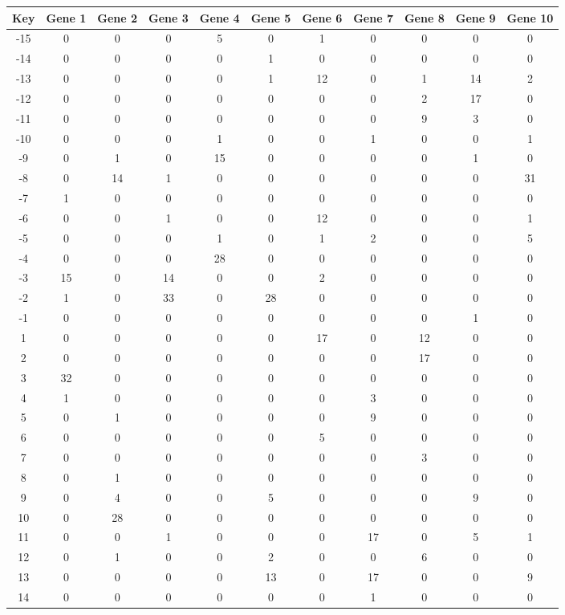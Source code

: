 \begin{tabular}{|c|c|c|c|c|c|c|c|c|c|c|}
\hline
Key & Gene 1 & Gene 2 & Gene 3 & Gene 4 & Gene 5 & Gene 6 & Gene 7 & Gene 8 & Gene 9 & Gene 10 \\
\hline
-15 & 0 & 0 & 0 & 5 & 0 & 1 & 0 & 0 & 0 & 0 \\
-14 & 0 & 0 & 0 & 0 & 1 & 0 & 0 & 0 & 0 & 0 \\
-13 & 0 & 0 & 0 & 0 & 1 & 12 & 0 & 1 & 14 & 2 \\
-12 & 0 & 0 & 0 & 0 & 0 & 0 & 0 & 2 & 17 & 0 \\
-11 & 0 & 0 & 0 & 0 & 0 & 0 & 0 & 9 & 3 & 0 \\
-10 & 0 & 0 & 0 & 1 & 0 & 0 & 1 & 0 & 0 & 1 \\
-9 & 0 & 1 & 0 & 15 & 0 & 0 & 0 & 0 & 1 & 0 \\
-8 & 0 & 14 & 1 & 0 & 0 & 0 & 0 & 0 & 0 & 31 \\
-7 & 1 & 0 & 0 & 0 & 0 & 0 & 0 & 0 & 0 & 0 \\
-6 & 0 & 0 & 1 & 0 & 0 & 12 & 0 & 0 & 0 & 1 \\
-5 & 0 & 0 & 0 & 1 & 0 & 1 & 2 & 0 & 0 & 5 \\
-4 & 0 & 0 & 0 & 28 & 0 & 0 & 0 & 0 & 0 & 0 \\
-3 & 15 & 0 & 14 & 0 & 0 & 2 & 0 & 0 & 0 & 0 \\
-2 & 1 & 0 & 33 & 0 & 28 & 0 & 0 & 0 & 0 & 0 \\
-1 & 0 & 0 & 0 & 0 & 0 & 0 & 0 & 0 & 1 & 0 \\
1 & 0 & 0 & 0 & 0 & 0 & 17 & 0 & 12 & 0 & 0 \\
2 & 0 & 0 & 0 & 0 & 0 & 0 & 0 & 17 & 0 & 0 \\
3 & 32 & 0 & 0 & 0 & 0 & 0 & 0 & 0 & 0 & 0 \\
4 & 1 & 0 & 0 & 0 & 0 & 0 & 3 & 0 & 0 & 0 \\
5 & 0 & 1 & 0 & 0 & 0 & 0 & 9 & 0 & 0 & 0 \\
6 & 0 & 0 & 0 & 0 & 0 & 5 & 0 & 0 & 0 & 0 \\
7 & 0 & 0 & 0 & 0 & 0 & 0 & 0 & 3 & 0 & 0 \\
8 & 0 & 1 & 0 & 0 & 0 & 0 & 0 & 0 & 0 & 0 \\
9 & 0 & 4 & 0 & 0 & 5 & 0 & 0 & 0 & 9 & 0 \\
10 & 0 & 28 & 0 & 0 & 0 & 0 & 0 & 0 & 0 & 0 \\
11 & 0 & 0 & 1 & 0 & 0 & 0 & 17 & 0 & 5 & 1 \\
12 & 0 & 1 & 0 & 0 & 2 & 0 & 0 & 6 & 0 & 0 \\
13 & 0 & 0 & 0 & 0 & 13 & 0 & 17 & 0 & 0 & 9 \\
14 & 0 & 0 & 0 & 0 & 0 & 0 & 1 & 0 & 0 & 0 \\
\hline
\end{tabular}